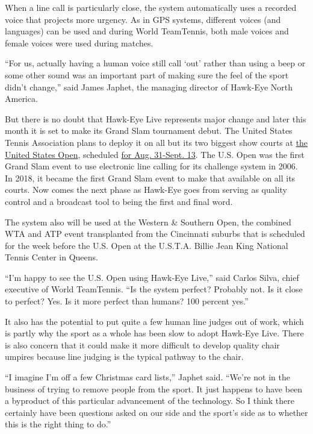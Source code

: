 When a line call is particularly close, the system automatically uses a
recorded voice that projects more urgency. As in GPS systems, different
voices (and languages) can be used and during World TeamTennis, both
male voices and female voices were used during matches.

``For us, actually having a human voice still call `out' rather than
using a beep or some other sound was an important part of making sure
the feel of the sport didn't change,'' said James Japhet, the managing
director of Hawk-Eye North America.

But there is no doubt that Hawk-Eye Live represents major change and
later this month it is set to make its Grand Slam tournament debut. The
United States Tennis Association plans to deploy it on all but its two
biggest show courts at
\href{https://www.nytimes3xbfgragh.onion/2020/06/15/sports/tennis/us-open.html}{the
United States Open}, scheduled
\href{https://www.nytimes3xbfgragh.onion/2020/06/16/sports/us-open-tennis-cuomo.html}{for
Aug. 31-Sept. 13}. The U.S. Open was the first Grand Slam event to use
electronic line calling for its challenge system in 2006. In 2018, it
became the first Grand Slam event to make that available on all its
courts. Now comes the next phase as Hawk-Eye goes from serving as
quality control and a broadcast tool to being the first and final word.

The system also will be used at the Western \& Southern Open, the
combined WTA and ATP event transplanted from the Cincinnati suburbs that
is scheduled for the week before the U.S. Open at the U.S.T.A. Billie
Jean King National Tennis Center in Queens.

``I'm happy to see the U.S. Open using Hawk-Eye Live,'' said Carlos
Silva, chief executive of World TeamTennis. ``Is the system perfect?
Probably not. Is it close to perfect? Yes. Is it more perfect than
humans? 100 percent yes.''

It also has the potential to put quite a few human line judges out of
work, which is partly why the sport as a whole has been slow to adopt
Hawk-Eye Live. There is also concern that it could make it more
difficult to develop quality chair umpires because line judging is the
typical pathway to the chair.

``I imagine I'm off a few Christmas card lists,'' Japhet said. ``We're
not in the business of trying to remove people from the sport. It just
happens to have been a byproduct of this particular advancement of the
technology. So I think there certainly have been questions asked on our
side and the sport's side as to whether this is the right thing to do.''

